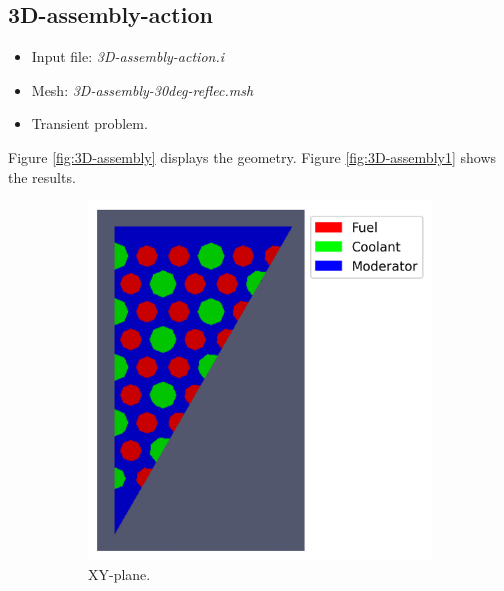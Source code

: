 \documentclass[11pt,letterpaper]{article}
\begin{document}
\subsection{3D-assembly-action}

	\begin{itemize}
		\item Input file: \textit{3D-assembly-action.i}
		\item Mesh: \textit{3D-assembly-30deg-reflec.msh}
		\item Transient problem.
	\end{itemize}

Figure \ref{fig:3D-assembly} displays the geometry.
Figure \ref{fig:3D-assembly1} shows the results.

	\begin{figure}[htbp!]
		\centering
		\begin{subfigure}[t]{0.4\textwidth}
			\centering
			\includegraphics[width=\linewidth]{3D-assembly-30deg-reflec-meshB1}
			\caption{XY-plane.}
		\end{subfigure}
		\begin{subfigure}[t]{0.4\textwidth}
			\centering

\end{subfigure}
\end{figure}
\end{document}
